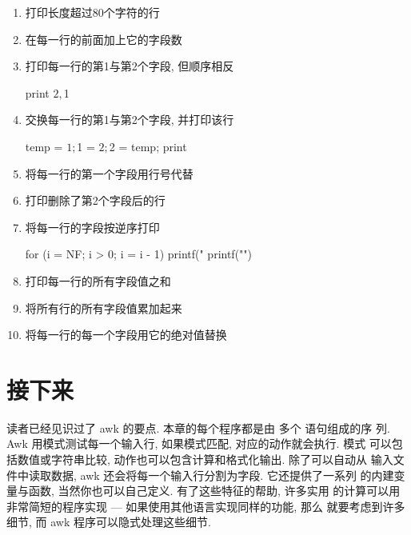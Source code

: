\begin{enumerate}
\begin{awkcode}
    NF > 0
\end{awkcode}
\item 打印长度超过80个字符的行
\item 在每一行的前面加上它的字段数
\item 打印每一行的第1与第2个字段, 但顺序相反
\begin{awkcode}
    { print $2, $1 }
\end{awkcode}
\item 交换每一行的第1与第2个字段, 并打印该行
\begin{awkcode}
    { temp = $1; $1 = $2; $2 = temp; print }
\end{awkcode}
\item 将每一行的第一个字段用行号代替
\item 打印删除了第2个字段后的行
\item 将每一行的字段按逆序打印
\begin{awkcode}
    { for (i = NF; i > 0; i = i - 1) printf("%
      printf("\n")
    }
\end{awkcode}
\item 打印每一行的所有字段值之和
\item 将所有行的所有字段值累加起来
\item 将每一行的每一个字段用它的绝对值替换
\end{enumerate}

\section{接下来}
\label{sec:what_next}
读者已经见识过了 awk 的要点. 本章的每个程序都是由
多个 \patact 语句组成的序
列. Awk 用模式测试每一个输入行, 如果模式匹配, 对应的动作就会执行. 模式
可以包括数值或字符串比较, 动作也可以包含计算和格式化输出. 除了可以自动从
输入文件中读取数据, awk 还会将每一个输入行分割为字段. 它还提供了一系列
的内建变量与函数, 当然你也可以自己定义. 有了这些特征的帮助, 许多实用
的计算可以用非常简短的程序实现 --- 如果使用其他语言实现同样的功能, 那么
就要考虑到许多细节, 而 awk 程序可以隐式处理这些细节.

